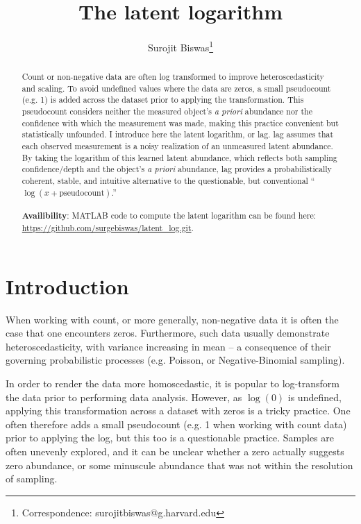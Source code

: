 \documentclass[11pt]{article}
\author[1]{Surojit Biswas\thanks{Correspondence: surojitbiswas@g.harvard.edu}}
\affil[1]{Department of Biomedical Informatics. Harvard Medical School. Boston, MA 02215. USA.}
\date{}
\title{The latent logarithm}
\begin{document}
\maketitle
\vspace{-10mm}
\begin{abstract}
Count or non-negative data are often log transformed to improve heteroscedasticity and scaling. To avoid undefined values where the data are zeros, a small pseudocount (e.g. 1) is added across the dataset prior to applying the transformation. This pseudocount considers neither the measured object's \emph{a priori} abundance nor the confidence with which the measurement was made, making this practice convenient but statistically unfounded. I introduce here the latent logarithm, or lag. lag assumes that each observed measurement is a noisy realization of an unmeasured latent abundance. By taking the logarithm of this learned latent abundance, which reflects both sampling confidence/depth and the object's \emph{a priori} abundance, lag provides a probabilistically coherent, stable, and intuitive alternative to the questionable, but conventional ``$\log(x + \textrm{pseudocount})$.'' \\
\\
\textbf{Availibility}: MATLAB code to compute the latent logarithm can be found here: \url{https://github.com/surgebiswas/latent_log.git}. 
\end{abstract}

\section{Introduction}
When working with count, or more generally, non-negative data it is often the case that one encounters zeros. Furthermore, such data usually demonstrate heteroscedasticity, with variance increasing in mean -- a consequence of their governing probabilistic processes (e.g. Poisson, or Negative-Binomial sampling). 

In order to render the data more homoscedastic, it is popular to log-transform the data prior to performing data analysis. However, as $\log(0)$ is undefined, applying this transformation across a dataset with zeros is a tricky practice. One often therefore adds a small pseudocount (e.g. 1 when working with count data) prior to applying the log, but this too is a questionable practice. Samples are often unevenly explored, and it can be unclear whether a zero actually suggests zero abundance, or some minuscule abundance that was not within the resolution of sampling. 
\end{document}

